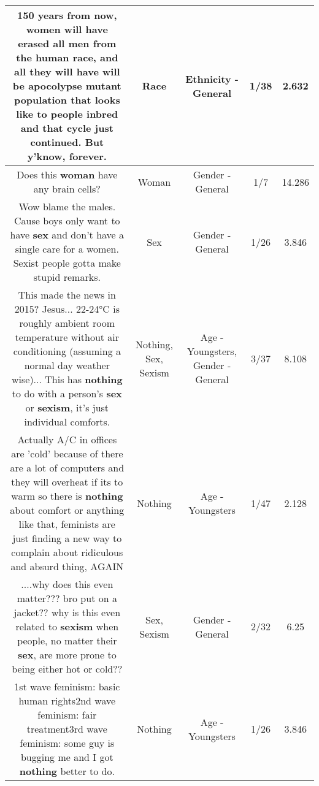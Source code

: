 \documentclass[11pt]{article}
\newlength\mylength
\begin{document}
\begin{center}
\begin{longtable}{|C{.65\mylength}|C{.30\mylength}|C{.12\mylength}|C{.12\mylength}|C{.12\mylength}|}
  \small 150 years from now, women will have erased all men from the human \textbf{race}, and all they will have will be apocolypse mutant population that looks like to people inbred and that cycle just continued. But y'know, forever.\normalsize   & Race & Ethnicity - General & 1/38 & 2.632 \\  \hline
  \small Does this \textbf{woman} have any brain cells?\normalsize   & Woman & Gender - General & 1/7 & 14.286 \\  \hline
  \small Wow blame the males. Cause boys only want to have \textbf{sex} and don't have a single care for a women. Sexist people gotta make stupid remarks.\normalsize   & Sex & Gender - General & 1/26 & 3.846 \\  \hline
  \small This made the news in 2015? Jesus... 22-24°C is roughly ambient room temperature without air conditioning (assuming a normal day weather wise)... This has \textbf{nothing} to do with a person's \textbf{sex} or \textbf{sexism}, it's just individual comforts.\normalsize   & Nothing, Sex, Sexism & Age - Youngsters, Gender - General & 3/37 & 8.108 \\  \hline
  \small Actually A/C in offices are 'cold' because of there are a lot of computers and they will overheat if its to warm so there is \textbf{nothing} about comfort or anything like that, feminists are just finding a new way to complain about ridiculous and absurd thing, AGAIN\normalsize   & Nothing & Age - Youngsters & 1/47 & 2.128 \\  \hline
  \small ....why does this even matter??? bro put on a jacket?? why is this even related to \textbf{sexism} when people, no matter their \textbf{sex}, are more prone to being either hot or cold??\normalsize   & Sex, Sexism & Gender - General & 2/32 & 6.25 \\  \hline
  \small 1st wave feminism: basic human rights2nd wave feminism: fair treatment3rd wave feminism: some guy is bugging me and I got \textbf{nothing} better to do.\normalsize   & Nothing & Age - Youngsters & 1/26 & 3.846 \\  \hline

\end{longtable}
\end{center}
\end{document}
